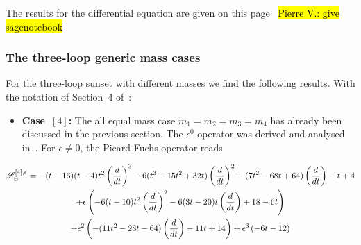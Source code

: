 \documentclass[a4paper,12pt]{article}
\numberwithin{equation}{section}
\numberwithin{figure}{section}
\def\su{\circleddash}
\newcommand{\pvnote}[1]{\sethlcolor{bubblegum} \protect\hl{Pierre V.: #1} \sethlcolor{yellow}}
\begin{document}
The results for the differential equation are given on this
page~\pvnote{give sagenotebook}



\subsubsection{The three-loop generic mass cases}\label{sec:threeloop}

For the three-loop sunset with different masses we find the following
results. With the notation of Section~4 of~\cite{Lairez:2022zkj}:
%
\begin{itemize}
\item  {\bf Case~$[4]$:} The all equal mass case $m_1=m_2=m_3=m_4$ has already been
  discussed in the previous section. The $\epsilon^0$ operator was derived and analysed in~\cite{Vanhove:2014wqa,Bloch:2014qca,Pogel:2022yat}. For $ \epsilon \ne 0$, the Picard-Fuchs operator reads
   \end{itemize}
  \begin{multline}
    \mathscr{L}_\su^{[4],\epsilon}=
    -(t - 16)  (t - 4)  t^2\left(d\over dt\right)^3 - 6  (t^3 -
                              15  t^2 + 32  t)  \left(d\over dt\right)^2 - (7  t^2 - 68  t +
                              64)  \left(d\over dt\right) - t + 4\cr
                              +\epsilon \left(-6  (t - 10  ) t^2 \left(d\over dt\right)^2 -
      6  (3  t - 20  ) t \left(d\over dt\right) +18- 6  t 
      \right)\cr
    +\epsilon^2\left(-(11  t^2 -
      28  t - 64)  \left(d\over dt\right) - 11  t + 14\right)+ \epsilon^3\left(-6  t - 12\right)
  \end{multline}
\end{document}
